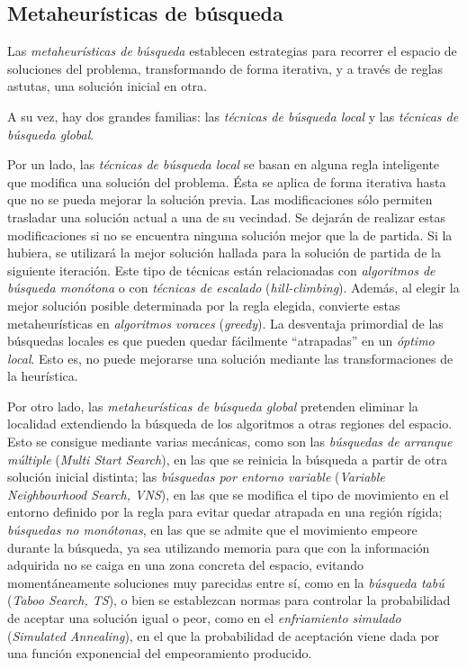 \subsection{Metaheurísticas de búsqueda} \label{subsec:2.3.1}
Las {\sl metaheurísticas de búsqueda} establecen estrategias para recorrer el espacio de soluciones del problema, transformando de forma iterativa, y a través de reglas astutas, una solución inicial en otra.

A su vez, hay dos grandes familias: las {\sl técnicas de búsqueda local} y las {\sl técnicas de búsqueda global}.

Por un lado, las {\sl técnicas de búsqueda local} se basan en alguna regla inteligente que modifica una solución del problema. Ésta se aplica de forma iterativa hasta que no se pueda mejorar la solución previa.
Las modificaciones sólo permiten trasladar una solución actual a una de su vecindad. Se dejarán de realizar estas modificaciones si no se encuentra ninguna solución mejor que la de partida. Si la hubiera, se utilizará la mejor solución hallada para la solución de partida de la siguiente iteración.
Este tipo de técnicas están relacionadas con {\sl algoritmos de búsqueda monótona} o con {\sl técnicas de escalado} (\textit{hill-climbing}). Además, al elegir la mejor solución posible determinada por la regla elegida, convierte estas metaheurísticas en {\sl algoritmos voraces} (\textit{greedy}).
La desventaja primordial de las búsquedas locales es que pueden quedar fácilmente ``atrapadas'' en un {\sl óptimo local}. Esto es, no puede mejorarse una solución mediante las transformaciones de la heurística.

Por otro lado, las {\sl metaheurísticas de búsqueda global} pretenden eliminar la localidad extendiendo la búsqueda de los algoritmos a otras regiones del espacio. Esto se consigue mediante varias mecánicas, como son las {\sl búsquedas de arranque múltiple} (\textit{Multi Start Search}), en las que se reinicia la búsqueda a partir de otra solución inicial distinta; las {\sl búsquedas por entorno variable} (\textit{Variable Neighbourhood Search, VNS}), en las que se modifica el tipo de movimiento en el entorno definido por la regla para evitar quedar atrapada en una región rígida; {\sl búsquedas no monótonas}, en las que se admite que el movimiento empeore durante la búsqueda, ya sea utilizando memoria para que con la información adquirida no se caiga en una zona concreta del espacio, evitando momentáneamente soluciones muy parecidas entre sí, como en la {\sl búsqueda tabú} (\textit{Taboo Search, TS}), o bien se establezcan normas para controlar la probabilidad de aceptar una solución igual o peor, como en el {\sl enfriamiento simulado} (\textit{Simulated Annealing}), en el que la probabilidad de aceptación viene dada por una función exponencial del empeoramiento producido.

